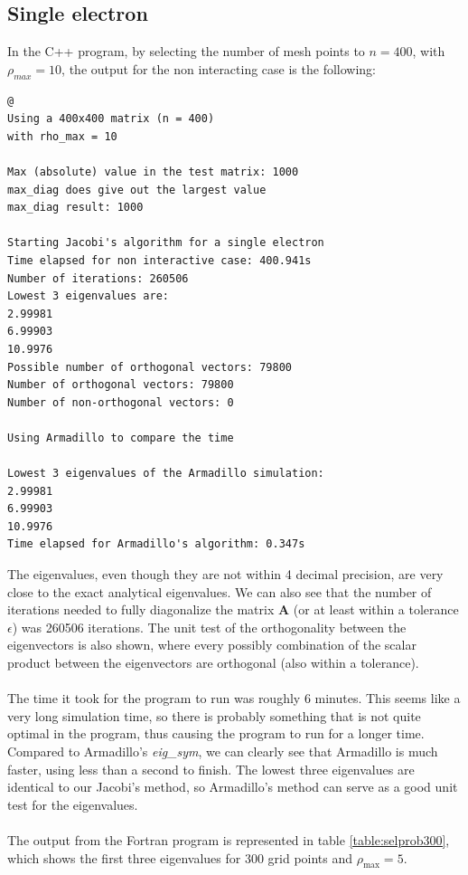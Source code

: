 \documentclass{article}
\begin{document}
\subsection{Single electron} \label{section:onee}
In the C++ program, by selecting the number of mesh points to $n=400$, with $\rho_{max} = 10$, the output for the non interacting case is the following:
\begin{lstlisting}
@
Using a 400x400 matrix (n = 400)
with rho_max = 10

Max (absolute) value in the test matrix: 1000
max_diag does give out the largest value
max_diag result: 1000 

Starting Jacobi's algorithm for a single electron
Time elapsed for non interactive case: 400.941s
Number of iterations: 260506
Lowest 3 eigenvalues are: 
2.99981
6.99903
10.9976
Possible number of orthogonal vectors: 79800
Number of orthogonal vectors: 79800
Number of non-orthogonal vectors: 0

Using Armadillo to compare the time

Lowest 3 eigenvalues of the Armadillo simulation: 
2.99981
6.99903
10.9976
Time elapsed for Armadillo's algorithm: 0.347s
\end{lstlisting}
The eigenvalues, even though they are not within 4 decimal precision, are very close to the exact analytical eigenvalues. We can also see that the number of iterations needed to fully diagonalize the matrix $\mathbf{A}$ (or at least within a tolerance $\epsilon$) was 260506 iterations. The unit test of the orthogonality between the eigenvectors is also shown, where every possibly combination of the scalar product between the eigenvectors are orthogonal (also within a tolerance).\\\\
The time it took for the program to run was roughly 6 minutes. This seems like a very long simulation time, so there is probably something that is not quite optimal in the program, thus causing the program to run for a longer time. Compared to Armadillo's \emph{eig\_sym}, we can clearly see that Armadillo is much faster, using less than a second to finish. The lowest three eigenvalues are identical to our Jacobi's method, so Armadillo's method can serve as a good unit test for the eigenvalues.\\\\
The output from the Fortran program is represented in table \ref{table:selprob300}, which shows the first three eigenvalues for 300 grid points and $\rho_\text{max} = 5$.\\
\end{document}
